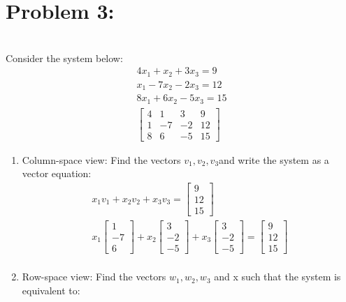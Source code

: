 \documentclass[12pt,a4paper]{article}
\begin{document}
\section{Problem 3:}\\
Consider the system below:
\begin{align*}
  4x_1 + x_2 + 3x_3 = 9\\
  x_1 - 7x_2 - 2x_3 = 12\\
  8x_1 + 6x_2 - 5x_3 =  15\\
  \begin{bmatrix}
 4 & 1 & 3 & 9 \\
 1 & -7 & -2 & 12 \\
 8 & 6 & -5 & 15
 \end{bmatrix}
\end{align*}
  \begin{enumerate}[label=(\alph*)]
    \item  Column-space view: Find the vectors $v_1,v_2,v_3$and write the system as a vector equation:
      \begin{align*}
        x_1v_1+x_2v_2+x_3v_3=
         \begin{bmatrix}
          9 \\
          12 \\
          15
        \end{bmatrix}\\
        x_1
        \begin{bmatrix}
         1 \\
         -7 \\
         6
       \end{bmatrix}
       +x_2
       \begin{bmatrix}
        3 \\
        -2 \\
        -5
      \end{bmatrix}
      +x_3\begin{bmatrix}
       3 \\
       -2 \\
       -5
     \end{bmatrix}
     =
      \begin{bmatrix}
       9 \\
       12 \\
       15
     \end{bmatrix}\\
 \end{align*}
 \item Row-space view: Find the vectors $w_1,w_2,w_3$ and x such that the system is equivalent to:

\end{enumerate}
\end{document}
